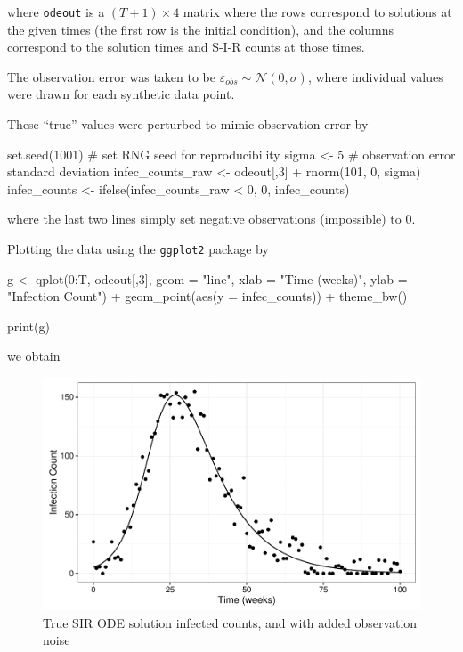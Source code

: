 \documentclass[12pt]{article}
\begin{document}
    where \verb|odeout| is a $(T+1) \times 4$ matrix where the rows correspond to solutions at the given times (the first row is the initial condition), and the columns correspond to the solution times and S-I-R counts at those times.

    The observation error was taken to be $\varepsilon_{obs} \sim \mathcal{N}(0,\sigma)$, where individual values were drawn for each synthetic data point.

    These ``true'' values were perturbed to mimic observation error by

    \begin{R}
    set.seed(1001)  # set RNG seed for reproducibility
    sigma <- 5       # observation error standard deviation
    infec_counts_raw <- odeout[,3] + rnorm(101, 0, sigma)
    infec_counts     <- ifelse(infec_counts_raw < 0, 0, infec_counts)
    \end{R}

    where the last two lines simply set negative observations (impossible) to 0.

    Plotting the data using the \verb|ggplot2| package by

    \begin{R}
	g <- qplot(0:T, odeout[,3], geom = "line", xlab = "Time (weeks)", ylab = "Infection Count") +
		geom_point(aes(y = infec_counts)) +
		theme_bw()

	print(g)
    \end{R}

    we obtain

    \begin{figure}[H]
        \centering
        \includegraphics[width=\textwidth]{./images/dataplot.pdf}
        \caption{True SIR ODE solution infected counts, and with added observation noise}
        \label{dataplot}
    \end{figure}
\end{document}
